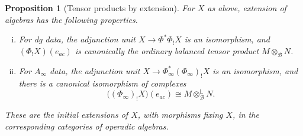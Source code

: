 \documentclass[11pt,letterpaper]{article}
\numberwithin{equation}{section}
\theoremstyle{plain}
\newtheorem{prop}[thm]{Proposition}
\theoremstyle{definition}
\theoremstyle{remark}
\begin{document}
\begin{prop}[Tensor products by extension]
\label{prop_tensor_algebra_extension}
For $X$ as above, extension of
algebras has the following properties.
\begin{enumerate}[(i)]
\item For dg data, the adjunction unit $X\to\Phi^*\Phi_!X$ is an
isomorphism, and $(\Phi_!X)(e_{ac})$ is canonically the ordinary
balanced tensor product $M\otimes_{\mathcal B}N$.
\item For $A_\infty$ data, the adjunction unit
$X\to\Phi_\infty^*(\Phi_\infty)_!X$ is an isomorphism, and there
is a canonical isomorphism of complexes
\begin{equation}\label{eq_tensor_extension_bar}
 \bigl((\Phi_\infty)_!X\bigr)(e_{ac})
 \cong M\otimes_{\mathcal B}^{\mathbb L}N.
\end{equation}
\end{enumerate}
These are the initial extensions of $X$, with morphisms fixing $X$,
in the corresponding categories of operadic algebras.
\end{prop}
\end{document}
